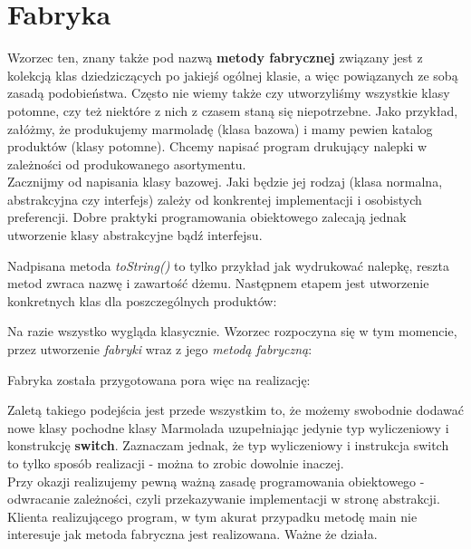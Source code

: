 \documentclass[12pt,a4paper]{article}
\begin{document}
	\section{Fabryka}
	Wzorzec ten, znany także pod nazwą \textbf{metody fabrycznej} związany jest z kolekcją klas dziedziczących po jakiejś ogólnej klasie, a więc powiązanych ze sobą zasadą podobieństwa. Często nie wiemy także czy utworzyliśmy wszystkie klasy potomne, czy też niektóre z nich z czasem staną się niepotrzebne. Jako przykład, załóżmy, że produkujemy marmoladę (klasa bazowa) i mamy pewien katalog produktów (klasy potomne). Chcemy napisać program drukujący nalepki w zależności od produkowanego asortymentu.\\
	Zacznijmy od napisania klasy bazowej. Jaki będzie jej rodzaj (klasa normalna, abstrakcyjna czy interfejs) zależy od konkrentej implementacji i osobistych preferencji. Dobre praktyki programowania obiektowego zalecają jednak utworzenie klasy abstrakcyjne bądź interfejsu.
	
	Nadpisana metoda \textit{toString()} to tylko przykład jak wydrukować nalepkę, reszta metod zwraca nazwę i zawartość dżemu. Następnem etapem jest utworzenie konkretnych klas dla poszczególnych produktów:
	
	
	Na razie wszystko wygląda klasycznie. Wzorzec rozpoczyna się w tym momencie, przez utworzenie \textit{fabryki} wraz z jego \textit{metodą fabryczną}:
	
	Fabryka została przygotowana pora więc na realizację:
	
	Zaletą takiego podejścia jest przede wszystkim to, że możemy swobodnie dodawać nowe klasy pochodne klasy Marmolada uzupełniając jedynie typ wyliczeniowy i konstrukcję \textbf{switch}. Zaznaczam jednak, że typ wyliczeniowy i instrukcja switch to tylko sposób realizacji - można to zrobic dowolnie inaczej.\\
	Przy okazji realizujemy pewną ważną zasadę programowania obiektowego - odwracanie zależności, czyli przekazywanie implementacji w stronę abstrakcji. Klienta realizującego program, w tym akurat przypadku metodę main nie interesuje jak metoda fabryczna jest realizowana. Ważne że działa.
\end{document}
